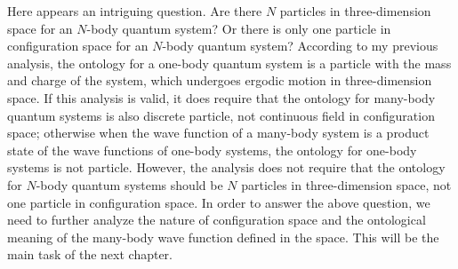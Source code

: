 Here appears an intriguing question.
Are there $N$ particles in three-dimension space for an $N$-body quantum system? Or there is only one particle in configuration space for an $N$-body quantum system?
According to my previous analysis, the ontology for a one-body quantum system is a particle with the mass and charge of the system, which undergoes ergodic motion in three-dimension space. %
If this analysis is valid, it does require that the ontology for many-body quantum systems is also discrete particle, not continuous field in configuration space; otherwise when the wave function of a many-body system is a product state of the wave functions of one-body systems, the ontology for one-body systems is not particle.
However, the analysis does not require that the ontology for $N$-body quantum systems should be $N$ particles in three-dimension space, not one particle in configuration space. 
In order to answer the above question, we need to further analyze the nature of configuration space and the ontological meaning of the many-body wave function defined in the space. This will be the main task of the next chapter.









